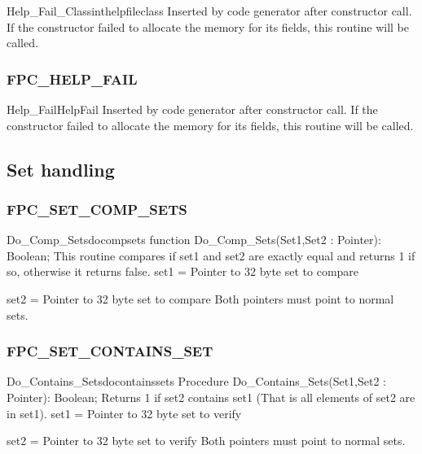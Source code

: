 \documentclass [a4paper,12pt]{article}
\begin{document}
\begin{functionl}{Help{\_}Fail{\_}Class}{inthelpfileclass}
\Description
Inserted by code generator after constructor call. If the constructor failed
to allocate the memory for its fields, this routine will be called.
\end{functionl}

\subsubsection{FPC{\_}HELP{\_}FAIL}
\label{subsubsec:mylabel85}

\begin{functionl}{Help{\_}Fail}{HelpFail}
\Description
Inserted by code generator after constructor call. If the constructor failed
to allocate the memory for its fields, this routine will be called.
\end{functionl}

\subsection{Set handling}
\label{subsec:mylabel10}

\subsubsection{FPC{\_}SET{\_}COMP{\_}SETS}
\label{subsubsec:mylabel86}

\begin{functionl}{Do{\_}Comp{\_}Sets}{docompsets}
\Declaration
function Do{\_}Comp{\_}Sets(Set1,Set2 : Pointer): Boolean;
\Description
This routine compares if set1 and set2 are exactly equal and returns 1 if
so, otherwise it returns false.
\Parameters
set1 = Pointer to 32 byte set to compare \par
set2 = Pointer to 32 byte set to compare
\Notes
Both pointers must point to normal sets.
\end{functionl}

\subsubsection{FPC{\_}SET{\_}CONTAINS{\_}SET}
\label{subsubsec:mylabel87}

\begin{procedurel}{Do{\_}Contains{\_}Sets}{docontainssets}
\Declaration
Procedure Do{\_}Contains{\_}Sets(Set1,Set2 : Pointer): Boolean;
\Description
Returns 1 if set2 contains set1 (That is all elements of set2 are in set1).
\Parameters
set1 = Pointer to 32 byte set to verify \par
set2 = Pointer to 32 byte set to verify
\Notes
Both pointers must point to normal sets.
\end{procedurel}
\end{document}

